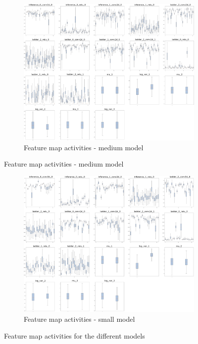 \begin{figure}
    \ContinuedFloat
    \centering
    \begin{subfigure}{.95\textwidth}
        \centering
        \includegraphics[width=\textwidth]{images/sparseness/encoder_fm2_fms.png}
        \caption{Feature map activities - medium model}
    \end{subfigure}
\end{figure}
\begin{figure}
    \ContinuedFloat
    \centering
    \begin{subfigure}{.95\textwidth}
        \centering
        \includegraphics[width=\textwidth]{images/sparseness/encoder_fm3_fms.png}
        \caption{Feature map activities - small model}
    \end{subfigure}
    \caption{Feature map activities for the different models}
    \label{fig:fm_activities_sparseness}
\end{figure}
